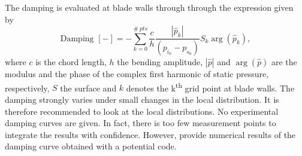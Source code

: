 The damping is evaluated at blade walls through through the
expression given by~\citet{Fransson1999}
\begin{equation}
    \textrm{Damping } [-] = - \sum^{\#~pts}_{k=0} \frac{c}{h} 
      \frac{|\widehat{p}_k|}{(p_{i_0} - p_{s_0})} S_k \arg (\widehat{p}_k),
\end{equation}
where $c$ is the chord length,
$h$ the bending amplitude, $| \widehat{p} |$ 
and $\arg (\widehat{p})$ are the modulus and the phase of the
complex first harmonic of static pressure, respectively, $S$ the surface
and $k$ denotes the k\textsuperscript{th}
grid point at blade walls.
The damping strongly varies under small changes in the
local distribution. It is therefore recommended to look at the local
distributions. No experimental damping curves are given. In fact,
there is too few measurement points to integrate the results with
confidence. However, \citet{Fransson1999}
provide numerical results of the damping curve obtained with a potential code.

